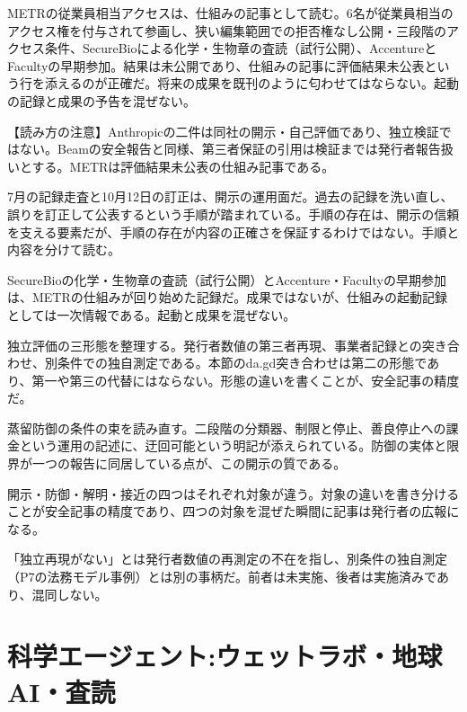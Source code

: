 \documentclass[lualatex,a4paper,10pt]{jlreq}
\begin{document}
METRの従業員相当アクセスは、仕組みの記事として読む。6名が従業員相当のアクセス権を付与されて参画し、狭い編集範囲での拒否権なし公開・三段階のアクセス条件、SecureBioによる化学・生物章の査読（試行公開）、AccentureとFacultyの早期参加。結果は未公開であり、仕組みの記事に評価結果未公表という行を添えるのが正確だ。将来の成果を既刊のように匂わせてはならない。起動の記録と成果の予告を混ぜない。
\cite{B39,B82}


\begin{tcolorbox}[colback=SurveySoft,colframe=SurveyRule,arc=1mm,boxrule=0.4pt,left=2mm,right=2mm]
【読み方の注意】Anthropicの二件は同社の開示・自己評価であり、独立検証ではない。Beamの安全報告と同様、第三者保証の引用は検証までは発行者報告扱いとする。METRは評価結果未公表の仕組み記事である。
\end{tcolorbox}
\cite{B40,B79,B41,B80,B42,B81,B39,B82}


7月の記録走査と10月12日の訂正は、開示の運用面だ。過去の記録を洗い直し、誤りを訂正して公表するという手順が踏まれている。手順の存在は、開示の信頼を支える要素だが、手順の存在が内容の正確さを保証するわけではない。手順と内容を分けて読む。
\cite{B40,B79}


SecureBioの化学・生物章の査読（試行公開）とAccenture・Facultyの早期参加は、METRの仕組みが回り始めた記録だ。成果ではないが、仕組みの起動記録としては一次情報である。起動と成果を混ぜない。
\cite{B39,B82}


独立評価の三形態を整理する。発行者数値の第三者再現、事業者記録との突き合わせ、別条件での独自測定である。本節のda.gd突き合わせは第二の形態であり、第一や第三の代替にはならない。形態の違いを書くことが、安全記事の精度だ。
\cite{B40,B79}


蒸留防御の条件の束を読み直す。二段階の分類器、制限と停止、善良停止への課金という運用の記述に、迂回可能という明記が添えられている。防御の実体と限界が一つの報告に同居している点が、この開示の質である。
\cite{B41,B80}


開示・防御・解明・接近の四つはそれぞれ対象が違う。対象の違いを書き分けることが安全記事の精度であり、四つの対象を混ぜた瞬間に記事は発行者の広報になる。
\cite{B40,B79,B41,B80,B42,B81,B39,B82}


「独立再現がない」とは発行者数値の再測定の不在を指し、別条件の独自測定（P7の法務モデル事例）とは別の事柄だ。前者は未実施、後者は実施済みであり、混同しない。


\section{科学エージェント:ウェットラボ・地球AI・査読}
\label{sec:P6}
\end{document}
